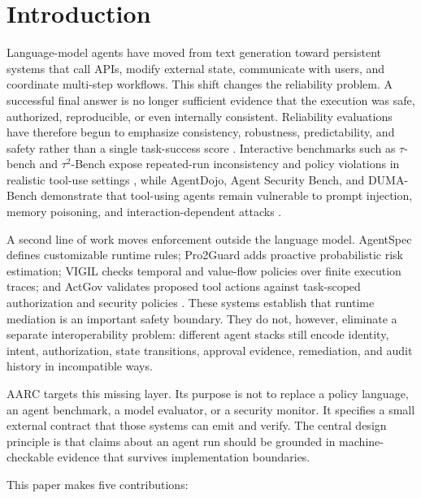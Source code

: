 \documentclass{article}
\begin{document}
\section{Introduction}

Language-model agents have moved from text generation toward persistent systems
that call APIs, modify external state, communicate with users, and coordinate
multi-step workflows. This shift changes the reliability problem. A successful
final answer is no longer sufficient evidence that the execution was safe,
authorized, reproducible, or even internally consistent. Reliability evaluations
have therefore begun to emphasize consistency, robustness, predictability, and
safety rather than a single task-success score
\cite{rabanser2026reliability}. Interactive benchmarks such as
$\tau$-bench and $\tau^2$-Bench expose repeated-run inconsistency and policy
violations in realistic tool-use settings \cite{yao2024taubench,barres2025tau2},
while AgentDojo, Agent Security Bench, and DUMA-Bench demonstrate that tool-using
agents remain vulnerable to prompt injection, memory poisoning, and
interaction-dependent attacks
\cite{debenedetti2024agentdojo,zhang2025asb,aleksandrov2026duma}.

A second line of work moves enforcement outside the language model.
AgentSpec defines customizable runtime rules; Pro2Guard adds proactive
probabilistic risk estimation; VIGIL checks temporal and value-flow policies over
finite execution traces; and ActGov validates proposed tool actions against
task-scoped authorization and security policies
\cite{wang2026agentspec,wang2025pro2guard,li2026vigil,zhang2026actgov}.
These systems establish that runtime mediation is an important safety boundary.
They do not, however, eliminate a separate interoperability problem: different
agent stacks still encode identity, intent, authorization, state transitions,
approval evidence, remediation, and audit history in incompatible ways.

AARC targets this missing layer. Its purpose is not to replace a policy language,
an agent benchmark, a model evaluator, or a security monitor. It specifies a
small external contract that those systems can emit and verify. The central
design principle is that claims about an agent run should be grounded in
machine-checkable evidence that survives implementation boundaries.

This paper makes five contributions:
\end{document}
